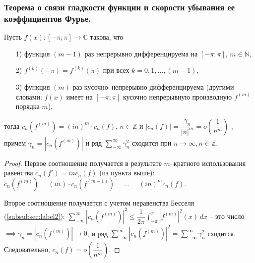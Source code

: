 \subsubsection{Теорема о связи гладкости функции и скорости убывания ее коэффициентов Фурье.}
\begin{theorem*} Пусть $f(x): \left[-\pi; \pi\right] \to \mathbb{C}$ такова, что
	\begin{itemize}
		\item[1)] функция $(m-1)$ раз непрерывно дифференцируема на $\left[ -\pi; \pi \right]$, $m \in \mathbb{N}$,
		\item[2)] $f^{(k)}(-\pi) = f^{(k)}(\pi)$ при всех $k = 0,1, \dotsc, (m-1)$,
		\item[3)] функция $(m)$ раз кусочно--непрерывно дифференцируема (другими словами: $f(x)\text{ имеет на } \left[ -\pi; \pi \right]$ кусочно непрерывную производную $f^{(m)}$ порядка $m$),
	\end{itemize}
	тогда $c_n(f^{(m)}) = (in)^m \cdot c_n(f),\, n \in \mathbb{Z}$ и $\left|c_n(f)\right| = \dfrac{\gamma_n}{|n|^m} = o\left(\dfrac{1}{n^m}\right)$ , причем $\gamma_n = |c_n(f^{(m)})|$ и ряд $\sum_{-\infty}^{\infty} \gamma_n^2$ сходится при  $n \to \infty, n \in \mathbb{Z}$.
\end{theorem*}
\begin{proof} Первое соотношение получается в результате $m$--кратного использования равенства $c_n(f') = inc_n(f)$ (из пункта выше): $c_n(f^{(m)}) = (in) \cdot c_n(f^{(m-1)}) = \dotsc  = (in)^mc_n(f)$. 
	
	Второе соотношение получается с учетом неравенства Бесселя (\ref{subsubsec:label2}): $\sum_{-\infty}^{\infty} |c_n(f^{(m)})|^2 \leqslant \dfrac{1}{2\pi} \int_{-\pi}^{\pi}|f^{(m)}|^2(x)\, dx$ -- это число $\implies \gamma_n = |c_n(f^{(m)})| \to 0$, и ряд $\sum_{-\infty}^{\infty} |c_n(f^{(m)})|^2 = \sum_{-\infty}^{\infty} \gamma_n^2 $ сходится.  Следовательно,  $c_n(f) = o\left(\dfrac{1}{n^m}\right)$.
	
\end{proof}
